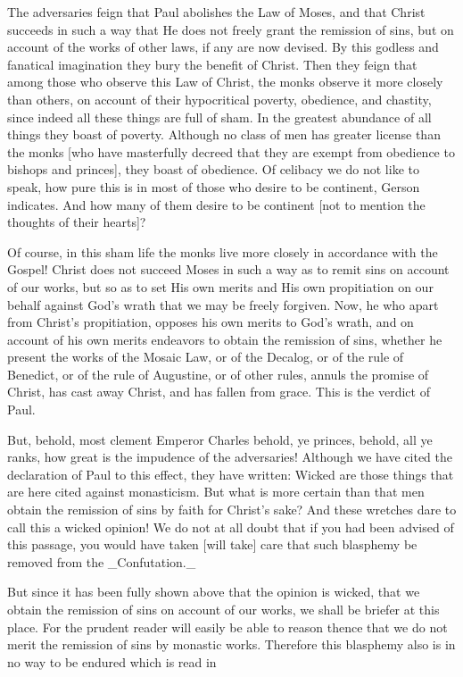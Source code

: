 The adversaries feign that Paul abolishes the Law of Moses, and that
Christ succeeds in such a way that He does not freely grant the
remission of sins, but on account of the works of other laws, if any
are now devised.  By this godless and fanatical imagination they bury
the benefit of Christ.  Then they feign that among those who observe
this Law of Christ, the monks observe it more closely than others, on
account of their hypocritical poverty, obedience, and chastity, since
indeed all these things are full of sham.  In the greatest abundance
of all things they boast of poverty.  Although no class of men has
greater license than the monks [who have masterfully decreed that
they are exempt from obedience to bishops and princes], they boast of
obedience.  Of celibacy we do not like to speak, how pure this is in
most of those who desire to be continent, Gerson indicates.  And how
many of them desire to be continent [not to mention the thoughts of
their hearts]?

Of course, in this sham life the monks live more closely in
accordance with the Gospel!  Christ does not succeed Moses in such a
way as to remit sins on account of our works, but so as to set His
own merits and His own propitiation on our behalf against God's wrath
that we may be freely forgiven.  Now, he who apart from Christ's
propitiation, opposes his own merits to God's wrath, and on account
of his own merits endeavors to obtain the remission of sins, whether
he present the works of the Mosaic Law, or of the Decalog, or of the
rule of Benedict, or of the rule of Augustine, or of other rules,
annuls the promise of Christ, has cast away Christ, and has fallen
from grace.  This is the verdict of Paul.

But, behold, most clement Emperor Charles behold, ye princes, behold,
all ye ranks, how great is the impudence of the adversaries!
Although we have cited the declaration of Paul to this effect, they
have written: Wicked are those things that are here cited against
monasticism.  But what is more certain than that men obtain the
remission of sins by faith for Christ's sake?  And these wretches
dare to call this a wicked opinion!  We do not at all doubt that if
you had been advised of this passage, you would have taken [will
take] care that such blasphemy be removed from the _Confutation._

But since it has been fully shown above that the opinion is wicked,
that we obtain the remission of sins on account of our works, we
shall be briefer at this place.  For the prudent reader will easily
be able to reason thence that we do not merit the remission of sins
by monastic works.  Therefore this blasphemy also is in no way to be
endured which is read in


